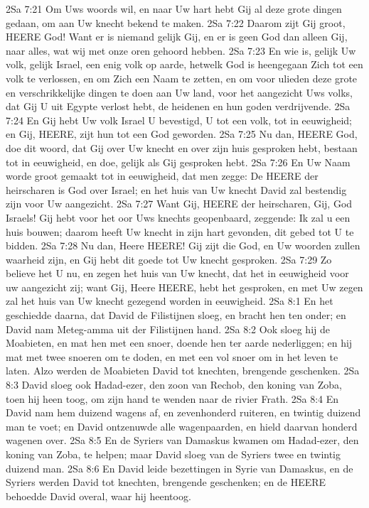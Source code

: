 2Sa 7:21  Om Uws woords wil, en naar Uw hart hebt Gij al deze grote dingen gedaan, om aan Uw knecht bekend te maken.
2Sa 7:22  Daarom zijt Gij groot, HEERE God! Want er is niemand gelijk Gij, en er is geen God dan alleen Gij, naar alles, wat wij met onze oren gehoord hebben.
2Sa 7:23  En wie is, gelijk Uw volk, gelijk Israel, een enig volk op aarde, hetwelk God is heengegaan Zich tot een volk te verlossen, en om Zich een Naam te zetten, en om voor ulieden deze grote en verschrikkelijke dingen te doen aan Uw land, voor het aangezicht Uws volks, dat Gij U uit Egypte verlost hebt, de heidenen en hun goden verdrijvende.
2Sa 7:24  En Gij hebt Uw volk Israel U bevestigd, U tot een volk, tot in eeuwigheid; en Gij, HEERE, zijt hun tot een God geworden.
2Sa 7:25  Nu dan, HEERE God, doe dit woord, dat Gij over Uw knecht en over zijn huis gesproken hebt, bestaan tot in eeuwigheid, en doe, gelijk als Gij gesproken hebt.
2Sa 7:26  En Uw Naam worde groot gemaakt tot in eeuwigheid, dat men zegge: De HEERE der heirscharen is God over Israel; en het huis van Uw knecht David zal bestendig zijn voor Uw aangezicht.
2Sa 7:27  Want Gij, HEERE der heirscharen, Gij, God Israels! Gij hebt voor het oor Uws knechts geopenbaard, zeggende: Ik zal u een huis bouwen; daarom heeft Uw knecht in zijn hart gevonden, dit gebed tot U te bidden.
2Sa 7:28  Nu dan, Heere HEERE! Gij zijt die God, en Uw woorden zullen waarheid zijn, en Gij hebt dit goede tot Uw knecht gesproken.
2Sa 7:29  Zo believe het U nu, en zegen het huis van Uw knecht, dat het in eeuwigheid voor uw aangezicht zij; want Gij, Heere HEERE, hebt het gesproken, en met Uw zegen zal het huis van Uw knecht gezegend worden in eeuwigheid.
2Sa 8:1  En het geschiedde daarna, dat David de Filistijnen sloeg, en bracht hen ten onder; en David nam Meteg-amma uit der Filistijnen hand.
2Sa 8:2  Ook sloeg hij de Moabieten, en mat hen met een snoer, doende hen ter aarde nederliggen; en hij mat met twee snoeren om te doden, en met een vol snoer om in het leven te laten. Alzo werden de Moabieten David tot knechten, brengende geschenken.
2Sa 8:3  David sloeg ook Hadad-ezer, den zoon van Rechob, den koning van Zoba, toen hij heen toog, om zijn hand te wenden naar de rivier Frath.
2Sa 8:4  En David nam hem duizend wagens af, en zevenhonderd ruiteren, en twintig duizend man te voet; en David ontzenuwde alle wagenpaarden, en hield daarvan honderd wagenen over.
2Sa 8:5  En de Syriers van Damaskus kwamen om Hadad-ezer, den koning van Zoba, te helpen; maar David sloeg van de Syriers twee en twintig duizend man.
2Sa 8:6  En David leide bezettingen in Syrie van Damaskus, en de Syriers werden David tot knechten, brengende geschenken; en de HEERE behoedde David overal, waar hij heentoog.
